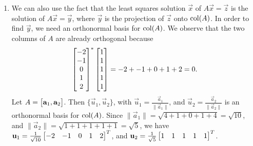 \documentclass{homework}
\begin{document}
\begin{enumerate}
		\item We can also use the fact that the least squares solution $\vec{x}$ of $A\vec{x} = \vec{z}$ is the solution of $A\vec{x} = \vec{y}$, where $\vec{y}$ is the projection of $\vec{z}$ onto $\mathrm{col}(A)$. In order to find $\vec{y}$, we need an orthonormal basis for $\mathrm{col}(A)$. We observe that the two columns of $A$ are already orthogonal because
		\begin{equation*}
			\left[\begin{matrix}-2\\-1\\0\\1\\2\end{matrix}\right]^*\left[\begin{matrix}1\\1\\1\\1\\1\end{matrix}\right] = -2 + -1 + 0 + 1 + 2 = 0.
		\end{equation*}
		Let $A = \left[\begin{matrix}\mathbf{a}_1, \mathbf{a}_2\end{matrix}\right]$. Then $\{\vec{u}_1, \vec{u}_2\}$, with $\vec{u}_1 = \frac{\vec{a}_1}{\lVert\vec{a}_1\rVert}$, and $\vec{u}_2 = \frac{\vec{a}_2}{\lVert\vec{a}_2\rVert}$ is an orthonormal basis for $\mathrm{col}(A)$. Since $\lVert\vec{a}_1\rVert=\sqrt{4+1+0+1+4} = \sqrt{10}$, and $\lVert \vec{a}_2\rVert = \sqrt{1+1+1+1+1} = \sqrt{5}$, we have $\mathbf{u}_1 = \frac{1}{\sqrt{10}}\left[\begin{matrix}-2&-1&0&1&2\end{matrix}\right]^T$, and $\mathbf{u}_2 = \frac{1}{\sqrt{5}}\left[\begin{matrix}1&1&1&1&1\end{matrix}\right]^T$.
		

\end{enumerate}
\end{document}
